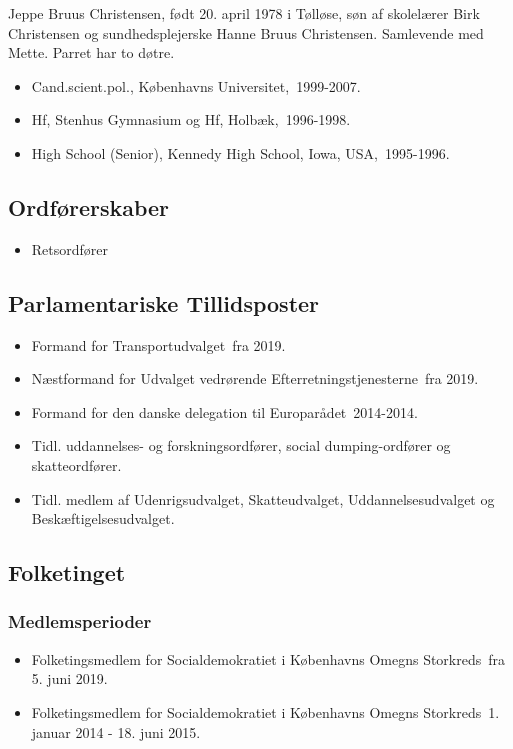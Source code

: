 \documentclass[11pt, a4paper]{awesome-cv}
\begin{document}
\makecvheader[R]
\makelettertitle
\begin{cvletter}
Jeppe Bruus Christensen, født 20. april 1978 i Tølløse, søn af skolelærer Birk Christensen og sundhedsplejerske Hanne Bruus Christensen. Samlevende med Mette. Parret har to døtre.

\begin{itemize}
\item Cand.scient.pol., Københavns Universitet, 1999-2007.
\item Hf, Stenhus Gymnasium og Hf, Holbæk, 1996-1998.
\item High School (Senior), Kennedy High School, Iowa, USA, 1995-1996.
\end{itemize}
\subsection*{Ordførerskaber}
\begin{itemize}
\item Retsordfører
\end{itemize}
\subsection*{Parlamentariske Tillidsposter}
\begin{itemize}
\item Formand for Transportudvalget fra 2019.
\item Næstformand for Udvalget vedrørende Efterretningstjenesterne fra 2019.
\item Formand for den danske delegation til Europarådet 2014-2014.
\item Tidl. uddannelses- og forskningsordfører, social dumping-ordfører og skatteordfører.
\item Tidl. medlem af Udenrigsudvalget, Skatteudvalget, Uddannelsesudvalget og Beskæftigelsesudvalget.
\end{itemize}
\subsection*{Folketinget}
\subsubsection*{Medlemsperioder}
\begin{itemize}
\item Folketingsmedlem for Socialdemokratiet i Københavns Omegns Storkreds fra 5. juni 2019.
\item Folketingsmedlem for Socialdemokratiet i Københavns Omegns Storkreds 1. januar 2014 - 18. juni 2015.
\end{itemize}

\end{cvletter}
\end{document}
